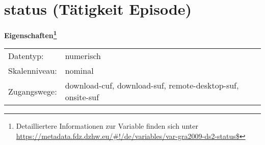 
    \setcounter{footnote}{0}

    \vspace*{-1.8cm}
	\section{status (Tätigkeit Episode)}
	\label{section:status}



    \vspace*{0.5cm}
    \noindent\textbf{Eigenschaften\footnote{Detailliertere Informationen zur Variable finden sich unter
		\url{https://metadata.fdz.dzhw.eu/\#!/de/variables/var-gra2009-ds2-status$}}}\\
	\begin{tabularx}{\hsize}{@{}lX}
	Datentyp: & numerisch \\
	Skalenniveau: & nominal \\
	Zugangswege: &
	  download-cuf, 
	  download-suf, 
	  remote-desktop-suf, 
	  onsite-suf
 \\
    \end{tabularx}



